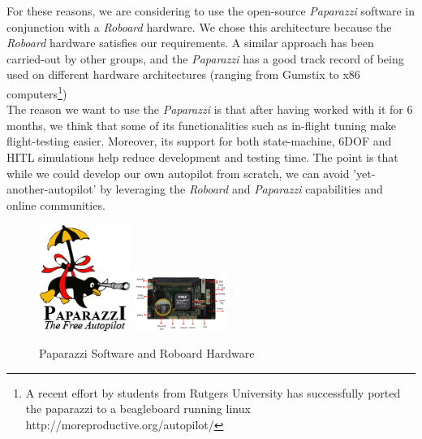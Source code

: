 \documentclass[titlepage,10pt]{article}
\begin{document}
For these reasons, we are considering to use the open-source \textit{Paparazzi} software in conjunction with a \textit{Roboard} hardware. We chose this architecture because the \textit{Roboard} hardware satisfies our requirements. A similar approach has been carried-out by other groups, and the \textit{Paparazzi} has a good track record of being used on different hardware architectures (ranging from Gumstix to x86 computers\footnote{A recent effort by students from Rutgers University has successfully ported the paparazzi to a beagleboard running linux http://moreproductive.org/autopilot/})\\

The reason we want to use the \textit{Paparazzi} is that after having worked with it for 6 months, we think that some of its functionalities such as in-flight tuning make flight-testing easier. Moreover, its support for both state-machine, 6DOF and HITL simulations help reduce development and testing time. The point is that while we could develop our own autopilot from scratch, we can avoid 'yet-another-autopilot' by leveraging the \textit{Roboard} and \textit{Paparazzi} capabilities and online communities.\\

\begin{figure}[h]
\begin{center}
\includegraphics[width = 30mm] {paparazzi.png}
\includegraphics[width = 30mm] {Roboard.png}
\caption{Paparazzi Software and Roboard Hardware}
\end{center}
\end{figure}

\newpage
\end{document}
